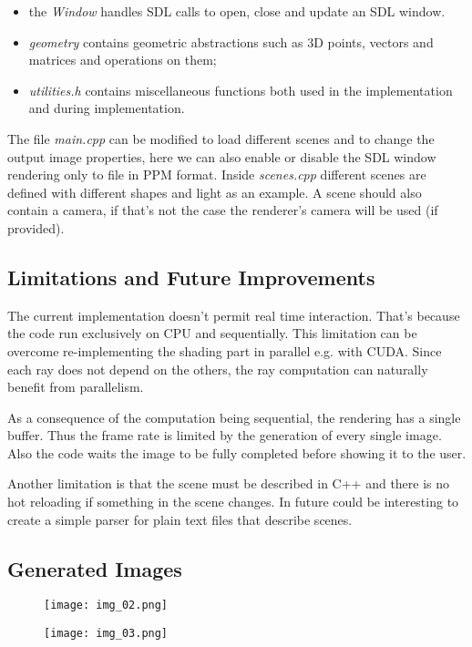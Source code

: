 \begin{itemize}
  \item the \emph{Window} handles SDL calls to open, close and update an SDL window.

  \item \emph{geometry} contains geometric abstractions such as 3D points, vectors and matrices and operations on them;
  \item \emph{utilities.h} contains miscellaneous functions both used in the implementation and during implementation.
\end{itemize}
The file \emph{main.cpp} can be modified to load different scenes and to change the output image properties, here we can also enable or disable the SDL window rendering only to file in PPM format.
Inside \emph{scenes.cpp} different scenes are defined with different shapes and light as an example.
A scene should also contain a camera, if that's not the case the renderer's camera will be used (if provided).


\subsection{Limitations and Future Improvements}
The current implementation doesn't permit real time interaction.
That's because the code run exclusively on CPU and sequentially.
This limitation can be overcome re-implementing the shading part in parallel e.g. with CUDA.
Since each ray does not depend on the others, the ray computation can naturally benefit from parallelism.

As a consequence of the computation being sequential, the rendering has a single buffer.
Thus the frame rate is limited by the generation of every single image.
Also the code waits the image to be fully completed before showing it to the user.

Another limitation is that the scene must be described in C++ and there is no hot reloading if something in the scene changes.
In future could be interesting to create a simple parser for plain text files that describe scenes.

\clearpage
\subsection{Generated Images}


\begin{figure}[!htb]
  \centering
  \texttt{[image: img\_02.png]}
\end{figure}


\begin{figure}[!htb]
  \centering
  \texttt{[image: img\_03.png]}
\end{figure}


